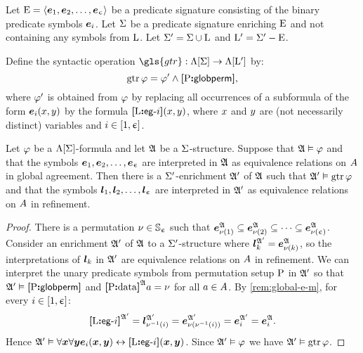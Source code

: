 Let $\mathrm{E} = \left\langle \bm{e}_{1},\bm{e}_{2},\dots,\bm{e}_{\upepsilon} \right\rangle$ be a predicate signature consisting
of the binary predicate symbols $\bm{e}_{i}$.
Let $\mathrm{\Sigma}$ be a predicate signature enriching $\mathrm{E}$ and not
containing any symbols from $\mathrm{L}$.
Let $\mathrm{\Sigma'} = \mathrm{\Sigma} \cup \mathrm{L}$ and
${\mathrm{L}'} = \mathrm{\Sigma'} - \mathrm{E}$.

\begin{definition}
Define the syntactic operation $\gls{gtr} : \aLF\sigS \to \aLF\LSp$ by:
\[
  \operatorname{gtr}\varphi = {\varphi'} \land {\bm{[}\mathrm{P}\mathord{\bm{:}}\mathsf{globperm}\bm{]}},
\]
where ${\varphi'}$ is obtained from $\varphi$ by replacing all occurrences of a
subformula of the form $\bm{e}_{i}(x,y)$ by the formula ${\bm{[}\mathrm{L}\mathord{\bm{:}}\mathsf{eg}{\hbox{-}}i\bm{]}}(x,y)$, 
where $x$ and $y$ are (not necessarily distinct) variables and
$i \in [1,\upepsilon]$.
\end{definition}

\begin{remark}\label{rem:global-e-to-m}
Let $\varphi$ be a $\Lambda[\mathrm{\Sigma}]$-formula and let $\mathfrak{A}$ be a
$\mathrm{\Sigma}$-structure.
Suppose that $\mathfrak{A} \vDash \varphi$ and that the symbols 
$\bm{e}_{1}, \bm{e}_{2}, \dots, \bm{e}_{\upepsilon}$ are interpreted in $\mathfrak{A}$ as equivalence
relations on $A$ in global agreement.
Then there is a $\mathrm{\Sigma'}$-enrichment $\mathfrak{A'}$ of $\mathfrak{A}$
such that $\mathfrak{A'} \vDash \operatorname{gtr}\varphi$ and that the symbols
$\bm{l}_{1},\bm{l}_{2}, \dots, \bm{l}_{\upepsilon}$ are interpreted in $\mathfrak{A'}$ as equivalence
relations on $A$ in refinement.
\end{remark}
\begin{proof}
There is a permutation $\nu \in \mathbb{S}_{\upepsilon}$ such that
$\bm{e}_{\nu(1)}^{\mathfrak{A}} \subseteq
\bm{e}_{\nu(2)}^{\mathfrak{A}} \subseteq
\dots \subseteq
\bm{e}_{\nu(\upepsilon)}^{\mathfrak{A}}$.
Consider an enrichment $\mathfrak{A'}$ of $\mathfrak{A}$
to a $\mathrm{\Sigma'}$-structure where 
$\bm{l}_{k}^{\mathfrak{A'}} = \bm{e}_{\nu(k)}^{\mathfrak{A}}$,
so the interpretations of $\bm{l}_{k}$ in $\mathfrak{A'}$ 
are equivalence relations on $A$ in refinement.
We can interpret the unary predicate symbols from permutation setup 
$\mathrm{P}$ in $\mathfrak{A'}$ so that 
$\mathfrak{A'} \vDash {\bm{[}\mathrm{P}\mathord{\bm{:}}\mathsf{globperm}\bm{]}}$ and 
${\bm{[}\mathrm{P}\mathord{\bm{:}}\mathrm{data}\bm{]}}^{\mathfrak{A}}a = \nu$ for all $a \in A$.
By \cref{rem:global-e-m}, for every $i \in [1,\upepsilon]$:
\[
  {\bm{[}\mathrm{L}\mathord{\bm{:}}\mathsf{eg}{\hbox{-}}i\bm{]}}^{\mathfrak{A'}} =
  \bm{l}_{\nu^{-1}(i)}^{\mathfrak{A'}} =
  \bm{e}_{\nu(\nu^{-1}(i))}^{\mathfrak{A'}} =
  \bm{e}_{i}^{\mathfrak{A'}} =
  \bm{e}_{i}^{\mathfrak{A}}.
\]
Hence $\mathfrak{A'} \vDash
  \forall\bm{x}\forall\bm{y} \bm{e}_{i}(\bm{x},\bm{y}) \leftrightarrow {\bm{[}\mathrm{L}\mathord{\bm{:}}\mathsf{eg}{\hbox{-}}i\bm{]}}(\bm{x},\bm{y})$.
Since $\mathfrak{A'} \vDash \varphi$ we have $\mathfrak{A'} \vDash \operatorname{gtr}\varphi$.
\end{proof}

